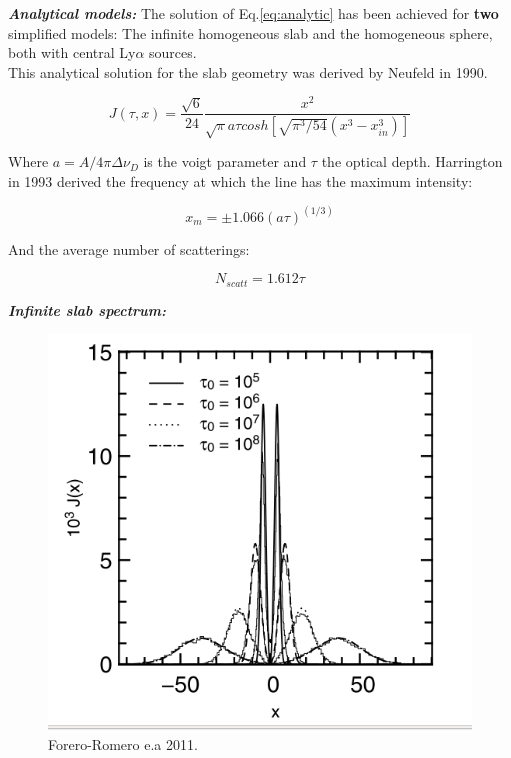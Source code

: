 \documentclass{beamer}
\begin{document}
\begin{frame}{\textit{\textbf{Analytical models:}}}
The solution of Eq.\ref{eq:analytic} has been achieved for \textbf{two} simplified 
models: The infinite homogeneous slab and the homogeneous sphere, both with central 
Ly$\alpha$ sources.\\

This analytical solution for the slab geometry was derived by Neufeld in 1990.  

\begin{equation}
J(\tau, x) = \dfrac{\sqrt{6}}{24}\dfrac{x^2}{\sqrt{\pi}a \tau cosh[\sqrt{\pi^3/54}(x^3 - x_{in}^3)]}
\end{equation}

Where $a = A / 4\pi \Delta \nu_D$ is the voigt parameter and $\tau$ the optical depth. Harrington in 
1993 derived the frequency at which the line has the maximum intensity:

\[
x_m = \pm 1.066 (a\tau)^(1/3)
\]

And the average number of scatterings:

\[
N_{scatt} = 1.612 \tau
\]

\end{frame}

\begin{frame}{\textit{\textbf{Infinite slab spectrum:}}}
\begin{figure}
\includegraphics[scale=0.4]{Figures/slab.png}
\caption*{Forero-Romero e.a 2011.}
\end{figure}
\end{frame}
\end{document}
